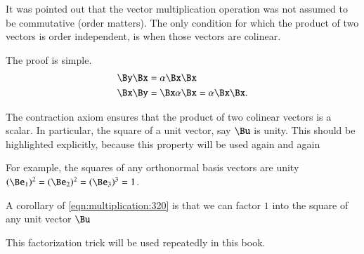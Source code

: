 %
%
It was pointed out that the vector multiplication operation was not assumed to be commutative (order matters).
The only condition for which the product of two vectors is order independent, is when those vectors are colinear.


The proof is simple.
\begin{dmath}\label{eqn:colinearVectors:380}
\begin{aligned}
\By \Bx &= \alpha \Bx \Bx \\
\Bx \By &= \Bx \alpha \Bx = \alpha \Bx \Bx.
\end{aligned}
\end{dmath}

The contraction axiom ensures that the product of two colinear vectors is a scalar.
In particular, the square of a unit vector, say \( \Bu \) is unity.
This should be highlighted explicitly, because this property will be used again and again

For example, the squares of any orthonormal basis vectors are unity \( (\Be_1)^2 = (\Be_2)^2 = (\Be_3)^3 = 1 \).

A corollary of
\cref{eqn:multiplication:320} is that we can factor \( 1 \) into
the square of any unit vector \( \Bu \)

This factorization trick will be used repeatedly in this book.
